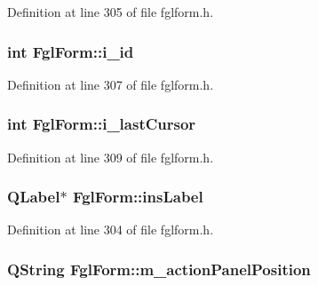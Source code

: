 Definition at line 305 of file fglform.h.

\hypertarget{classFglForm_a6142cd4363f16562e52631f1987b46c3}{
\subsubsection[{i\_\-id}]{\setlength{\rightskip}{0pt plus 5cm}int {\bf FglForm::i\_\-id}}}
\label{classFglForm_a6142cd4363f16562e52631f1987b46c3}


Definition at line 307 of file fglform.h.

\hypertarget{classFglForm_a9f622b4a17fcad8c785e119d19abe326}{
\subsubsection[{i\_\-lastCursor}]{\setlength{\rightskip}{0pt plus 5cm}int {\bf FglForm::i\_\-lastCursor}}}
\label{classFglForm_a9f622b4a17fcad8c785e119d19abe326}


Definition at line 309 of file fglform.h.

\hypertarget{classFglForm_a72467aa7c8750f7075b7ba7fc67a29bb}{
\subsubsection[{insLabel}]{\setlength{\rightskip}{0pt plus 5cm}QLabel$\ast$ {\bf FglForm::insLabel}}}
\label{classFglForm_a72467aa7c8750f7075b7ba7fc67a29bb}


Definition at line 304 of file fglform.h.

\hypertarget{classFglForm_af3882d981d23db8e6dca26a44ac23051}{
\subsubsection[{m\_\-actionPanelPosition}]{\setlength{\rightskip}{0pt plus 5cm}QString {\bf FglForm::m\_\-actionPanelPosition}}}
\label{classFglForm_af3882d981d23db8e6dca26a44ac23051}


